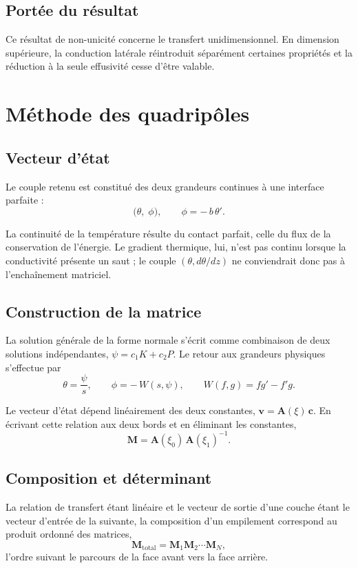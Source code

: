 \documentclass[11pt,a4paper]{article}
\begin{document}
\subsection{Portée du résultat}

Ce résultat de non-unicité concerne le transfert unidimensionnel. En dimension supérieure, la
conduction latérale réintroduit séparément certaines propriétés et la réduction à la seule effusivité
cesse d'être valable.

\section{Méthode des quadripôles}

\subsection{Vecteur d'état}

Le couple retenu est constitué des deux grandeurs continues à une interface parfaite :
\[ \bigl(\theta,\; \phi\bigr) , \qquad \phi = -\,b\,\theta' . \]

La continuité de la température résulte du contact parfait, celle du flux de la conservation de
l'énergie. Le gradient thermique, lui, n'est pas continu lorsque la conductivité présente un saut ; le
couple $(\theta, d\theta/dz)$ ne conviendrait donc pas à l'enchaînement matriciel.

\subsection{Construction de la matrice}

La solution générale de la forme normale s'écrit comme combinaison de deux solutions indépendantes,
$\psi = c_{1}K + c_{2}P$. Le retour aux grandeurs physiques s'effectue par
\[ \theta = \frac{\psi}{s} , \qquad \phi = -\,W(s,\psi) ,
\qquad W(f,g) = f g' - f' g . \]

Le vecteur d'état dépend linéairement des deux constantes, $\mathbf{v} = \mathbf{A}(\xi)\,\mathbf{c}$.
En écrivant cette relation aux deux bords et en éliminant les constantes,
\[ \mathbf{M} = \mathbf{A}(\xi_{0})\,\mathbf{A}(\xi_{1})^{-1} . \]

\subsection{Composition et déterminant}

La relation de transfert étant linéaire et le vecteur de sortie d'une couche étant le vecteur d'entrée
de la suivante, la composition d'un empilement correspond au produit ordonné des matrices,
\[ \mathbf{M}_{\text{total}} = \mathbf{M}_{1}\mathbf{M}_{2}\cdots\mathbf{M}_{N} , \]
l'ordre suivant le parcours de la face avant vers la face arrière.
\end{document}
